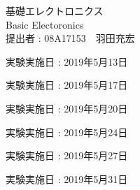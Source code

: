 \documentclass[11pt, a4paper,twocolumn]{jarticle}
\begin{document}
\begin{titlepage}
  \begin{center}
    {\Huge 基礎エレクトロニクス}\\
    \vspace{10truept}
    {\Huge Basic Electoronics}\\
    \vspace{30truept}
    {\huge 提出者 : 08A17153　羽田充宏}\\ %
    \vspace{50truept}

    \begin{list}{}{\setlength{\leftmargin}{95pt}}
    \item {\huge 実験実施日 : 2019年5月13日}\\
    \vspace{10truept}
    \item {\huge 実験実施日 : 2019年5月17日}\\
    \vspace{10truept}
    \item {\huge 実験実施日 : 2019年5月20日}\\
    \vspace{10truept}
    \item {\huge 実験実施日 : 2019年5月24日}\\
    \vspace{10truept}
    \item {\huge 実験実施日 : 2019年5月27日}\\
    \vspace{10truept}
    \item {\huge 実験実施日 : 2019年5月31日}\\
    \vspace{40truept}

    \end{list}
    \vspace{50truept}

  \end{center}
\end{titlepage}
\end{document}
